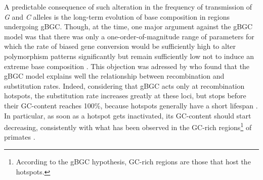 \begin{mccorrection}


A predictable consequence of such alteration in the frequency of transmission of \textit{G} and \textit{C} alleles is the long-term evolution of base composition in regions undergoing gBGC\@.
Though, at the time, one major argument against the gBGC model was that there was only a one-order-of-magnitude range of parameters for which the rate of biased gene conversion would be sufficiently high to alter polymorphism patterns significantly but remain sufficiently low not to induce an extreme base composition \citep{eyre-walker1999evidence}.
This objection was adressed by \citet{duret2008impact} who found that the gBGC model explains well the relationship between recombination and substitution rates.
Indeed, considering that gBGC acts only at recombination hotspots, the substitution rate increases greatly at these loci, but stops before their GC-content reaches 100\%, because hotspots generally have a short lifespan \citep{ptak2005finescale,winckler2005comparison}. 
In particular, as soon as a hotspot gets inactivated, its GC-content should start decreasing, consistently with what has been observed in the GC-rich regions\footnote{According to the gBGC hypothesis, GC-rich regions are those that host the hotspots.} of primates \citep{duret2002vanishing,belle2004decline,meunier2004recombination,duret2006gc}.



\end{mccorrection}
